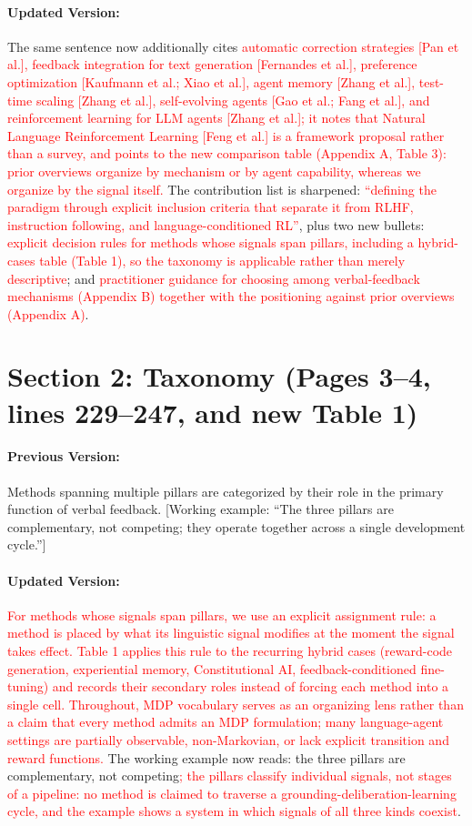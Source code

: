 \documentclass[11pt]{article}
\newcommand{\red}[1]{\textcolor{red}{#1}}
\begin{document}
\paragraph{Updated Version:} The same sentence now additionally cites \red{automatic correction strategies [Pan et al.], feedback integration for text generation [Fernandes et al.], preference optimization [Kaufmann et al.; Xiao et al.], agent memory [Zhang et al.], test-time scaling [Zhang et al.], self-evolving agents [Gao et al.; Fang et al.], and reinforcement learning for LLM agents [Zhang et al.]; it notes that Natural Language Reinforcement Learning [Feng et al.] is a framework proposal rather than a survey, and points to the new comparison table (Appendix A, Table 3): prior overviews organize by mechanism or by agent capability, whereas we organize by the signal itself.} The contribution list is sharpened: \red{``defining the paradigm through explicit inclusion criteria that separate it from RLHF, instruction following, and language-conditioned RL''}, plus two new bullets: \red{explicit decision rules for methods whose signals span pillars, including a hybrid-cases table (Table 1), so the taxonomy is applicable rather than merely descriptive}; and \red{practitioner guidance for choosing among verbal-feedback mechanisms (Appendix B) together with the positioning against prior overviews (Appendix A)}.

\section{Section 2: Taxonomy (Pages 3--4, lines 229--247, and new Table 1)}

\paragraph{Previous Version:} Methods spanning multiple pillars are categorized by their role in the primary function of verbal feedback. [Working example: ``The three pillars are complementary, not competing; they operate together across a single development cycle.'']

\paragraph{Updated Version:} \red{For methods whose signals span pillars, we use an explicit assignment rule: a method is placed by what its linguistic signal modifies at the moment the signal takes effect. Table 1 applies this rule to the recurring hybrid cases (reward-code generation, experiential memory, Constitutional AI, feedback-conditioned fine-tuning) and records their secondary roles instead of forcing each method into a single cell. Throughout, MDP vocabulary serves as an organizing lens rather than a claim that every method admits an MDP formulation; many language-agent settings are partially observable, non-Markovian, or lack explicit transition and reward functions.} The working example now reads: the three pillars are complementary, not competing\red{; the pillars classify individual signals, not stages of a pipeline: no method is claimed to traverse a grounding-deliberation-learning cycle, and the example shows a system in which signals of all three kinds coexist}.
\end{document}
